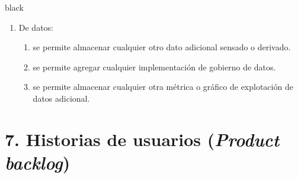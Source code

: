 \documentclass[
11pt, %
]{charter}
\begin{document}
\begin{consigna}{black}
\begin{enumerate}
\begin{enumerate}
			\item De datos:
				\begin{enumerate}			
					\item se permite almacenar cualquier otro dato adicional sensado o derivado.
					\item se permite agregar cualquier implementación de gobierno de datos.	
					\item se permite almacenar cualquier otra métrica o gráfico de explotación de datos adicional.
				\end{enumerate}
		
	\end{enumerate}
\end{enumerate}
\end{consigna}

\section{7. Historias de usuarios (\textit{Product backlog})}
\label{sec:backlog}
\end{document}
